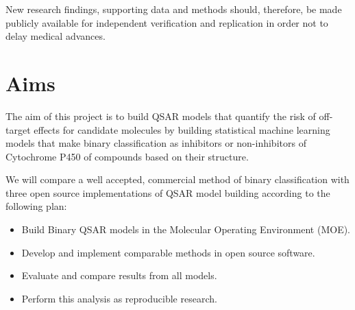 New research findings, supporting data and methods should, therefore, be made publicly available for independent verification and replication in order not to delay medical advances.

\pagebreak

\section{Aims}
The aim of this project is to build QSAR models that quantify the risk of off-target effects for candidate molecules by building statistical machine learning models that make binary classification as inhibitors or non-inhibitors of Cytochrome P450 of compounds based on their structure.

We will compare a well accepted, commercial method of binary classification with three open source implementations of QSAR model building according to the following plan:

\begin{itemize}

\item Build Binary QSAR models in the Molecular Operating Environment (MOE).

\item Develop and implement comparable methods in open source software.

\item Evaluate and compare results from all models.

\item Perform this analysis as reproducible research.

\end{itemize}
